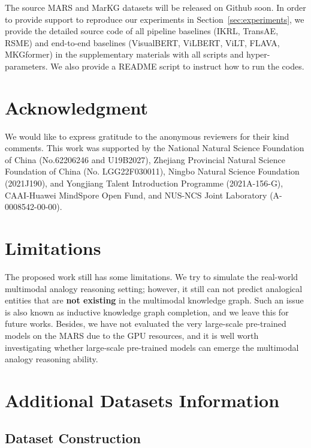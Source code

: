 \documentclass{article} \usepackage{iclr2023_conference,times}
\newcommand{\data}{MARS}
\newcommand{\kg}{MarKG}
\begin{document}
The source {\data} and  {\kg} datasets will be released on Github soon. 
In order to provide support to reproduce our experiments in Section~\ref{sec:experiments}, we provide the detailed source code of all pipeline baselines (IKRL, TransAE, RSME) and end-to-end baselines (VisualBERT, ViLBERT, ViLT, FLAVA, MKGformer) in the supplementary materials with all scripts and hyper-parameters. 
We also provide a README script to instruct how to run the codes. 

\section*{Acknowledgment}

We would like to express gratitude to the anonymous reviewers for their kind comments. 
This work was supported by the National Natural Science Foundation of China (No.62206246 and U19B2027), Zhejiang Provincial Natural Science Foundation of China (No. LGG22F030011), Ningbo Natural Science Foundation (2021J190), and Yongjiang Talent Introduction Programme (2021A-156-G), CAAI-Huawei MindSpore Open Fund, and NUS-NCS Joint Laboratory (A-0008542-00-00).






 
\appendix


\section{Limitations}
\label{adx:limitation}
The proposed work still has some limitations. 
We try to simulate the real-world multimodal analogy reasoning setting; however, it still can not predict analogical entities that are \textbf{not existing} in the multimodal knowledge graph.
Such an issue is also known as inductive knowledge graph completion, and we leave this for future works.
Besides, we have not evaluated the very large-scale pre-trained models on the {\data} due to the GPU resources, and it is well worth investigating whether large-scale pre-trained models can emerge the multimodal analogy reasoning ability.


\section{Additional Datasets Information}
\label{adx:dataset}

\subsection{Dataset Construction}
\label{adx:construction}
\end{document}
